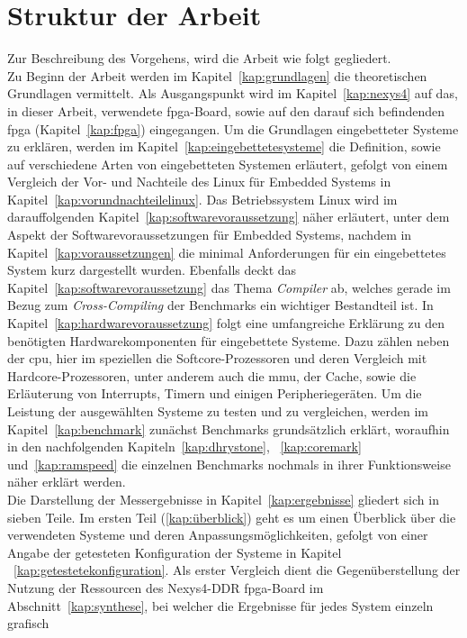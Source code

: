  \section{Struktur der Arbeit}\label{kap:strukturderarbeit}

Zur Beschreibung des Vorgehens, wird die Arbeit wie folgt gegliedert.\\
 Zu Beginn der Arbeit werden im Kapitel~\ref{kap:grundlagen} die theoretischen Grundlagen vermittelt. Als
Ausgangspunkt wird im Kapitel~\ref{kap:nexys4} auf das, in dieser Arbeit, verwendete \ac{fpga}-Board, sowie auf den darauf sich befindenden \ac{fpga} (Kapitel~\ref{kap:fpga}) eingegangen.
 Um die Grundlagen eingebetteter Systeme zu erklären, werden im Kapitel~\ref{kap:eingebettetesysteme} die Definition, sowie auf verschiedene Arten von eingebetteten Systemen erläutert, gefolgt von
 einem Vergleich der Vor- und Nachteile des Linux für Embedded Systems in Kapitel~\ref{kap:vorundnachteilelinux}. Das Betriebssystem Linux wird im darauffolgenden Kapitel~\ref{kap:softwarevoraussetzung} näher
 erläutert, unter dem Aspekt der Softwarevoraussetzungen für Embedded Systems, nachdem in Kapitel~\ref{kap:voraussetzungen} die minimal Anforderungen für ein eingebettetes System kurz dargestellt wurden.
 Ebenfalls deckt das Kapitel~\ref{kap:softwarevoraussetzung} das Thema \emph{Compiler} ab, welches gerade im Bezug zum \emph{Cross-Compiling} der Benchmarks ein wichtiger Bestandteil ist.
 In Kapitel~\ref{kap:hardwarevoraussetzung} folgt eine umfangreiche Erklärung zu den benötigten Hardwarekomponenten für eingebettete Systeme. Dazu zählen neben der \ac{cpu}, hier im speziellen die
 Softcore-Prozessoren und deren Vergleich mit Hardcore-Prozessoren, unter anderem auch die \ac{mmu}, der Cache, sowie die Erläuterung von Interrupts, Timern und einigen Peripheriegeräten. Um die Leistung
 der ausgewählten Systeme zu testen und zu vergleichen, werden im Kapitel~\ref{kap:benchmark} zunächst Benchmarks grundsätzlich erklärt, woraufhin in den nachfolgenden Kapiteln~\ref{kap:dhrystone},
~\ref{kap:coremark} und~\ref{kap:ramspeed} die einzelnen Benchmarks nochmals in ihrer Funktionsweise näher erklärt werden.\\
Die Darstellung der Messergebnisse in Kapitel~\ref{kap:ergebnisse} gliedert sich in sieben Teile.
Im ersten Teil (\ref{kap:überblick}) geht es um einen Überblick über die verwendeten Systeme und deren Anpassungsmöglichkeiten, gefolgt von einer Angabe der getesteten Konfiguration der Systeme in Kapitel
~\ref{kap:getestetekonfiguration}.
Als erster Vergleich dient die Gegenüberstellung der Nutzung der Ressourcen des Nexys4-DDR \ac{fpga}-Board im Abschnitt~\ref{kap:synthese}, bei welcher die Ergebnisse für jedes System einzeln grafisch
